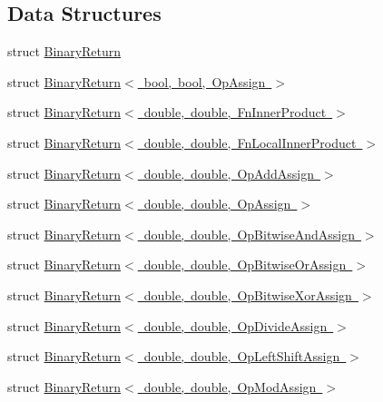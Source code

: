 \subsection*{Data Structures}
\begin{DoxyCompactItemize}
\item 
struct \mbox{\hyperlink{structENSEM_1_1BinaryReturn}{Binary\+Return}}
\item 
struct \mbox{\hyperlink{structENSEM_1_1BinaryReturn_3_01bool_00_01bool_00_01OpAssign_01_4}{Binary\+Return$<$ bool, bool, Op\+Assign $>$}}
\item 
struct \mbox{\hyperlink{structENSEM_1_1BinaryReturn_3_01double_00_01double_00_01FnInnerProduct_01_4}{Binary\+Return$<$ double, double, Fn\+Inner\+Product $>$}}
\item 
struct \mbox{\hyperlink{structENSEM_1_1BinaryReturn_3_01double_00_01double_00_01FnLocalInnerProduct_01_4}{Binary\+Return$<$ double, double, Fn\+Local\+Inner\+Product $>$}}
\item 
struct \mbox{\hyperlink{structENSEM_1_1BinaryReturn_3_01double_00_01double_00_01OpAddAssign_01_4}{Binary\+Return$<$ double, double, Op\+Add\+Assign $>$}}
\item 
struct \mbox{\hyperlink{structENSEM_1_1BinaryReturn_3_01double_00_01double_00_01OpAssign_01_4}{Binary\+Return$<$ double, double, Op\+Assign $>$}}
\item 
struct \mbox{\hyperlink{structENSEM_1_1BinaryReturn_3_01double_00_01double_00_01OpBitwiseAndAssign_01_4}{Binary\+Return$<$ double, double, Op\+Bitwise\+And\+Assign $>$}}
\item 
struct \mbox{\hyperlink{structENSEM_1_1BinaryReturn_3_01double_00_01double_00_01OpBitwiseOrAssign_01_4}{Binary\+Return$<$ double, double, Op\+Bitwise\+Or\+Assign $>$}}
\item 
struct \mbox{\hyperlink{structENSEM_1_1BinaryReturn_3_01double_00_01double_00_01OpBitwiseXorAssign_01_4}{Binary\+Return$<$ double, double, Op\+Bitwise\+Xor\+Assign $>$}}
\item 
struct \mbox{\hyperlink{structENSEM_1_1BinaryReturn_3_01double_00_01double_00_01OpDivideAssign_01_4}{Binary\+Return$<$ double, double, Op\+Divide\+Assign $>$}}
\item 
struct \mbox{\hyperlink{structENSEM_1_1BinaryReturn_3_01double_00_01double_00_01OpLeftShiftAssign_01_4}{Binary\+Return$<$ double, double, Op\+Left\+Shift\+Assign $>$}}
\item 
struct \mbox{\hyperlink{structENSEM_1_1BinaryReturn_3_01double_00_01double_00_01OpModAssign_01_4}{Binary\+Return$<$ double, double, Op\+Mod\+Assign $>$}}

\end{DoxyCompactItemize}

